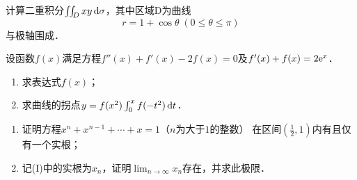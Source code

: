 \documentclass[plain,noanswer,medmath]{../../template/jnuexam}
\begin{document}
\begin{problem}[points=10]计算二重积分$\iint_D xy\d\sigma$，其中区域D为曲线
$$r = 1 + \cos \theta \;\left(0 \le \theta \le \pi \right)$$
与极轴围成．
\end{problem}


\begin{problem}[points=11]
设函数$f(x)$满足方程$f''(x) + f'(x) - 2f(x) = 0$及$f'(x) + f(x) = 2\mathrm{e}^x$．
\begin{enumerate}
\item 求表达式$f(x)$；
\item 求曲线的拐点$y = f(x^2)\int_0^x f(- t^2)\mathop{}\!\mathrm{d} t$．
\end{enumerate}
\end{problem}




\begin{problem}[points=11]
\begin{enumerate}
\item
证明方程$x^n + x^{n - 1} + \cdots + x = 1$（$n$为大于$1$的整数）%
在区间$\left(\frac{1}{2},1 \right)$内有且仅有一个实根；
\item
记(I)中的实根为$x_n$，证明$\lim_{n \to \infty} x_n$存在，并求此极限．
\end{enumerate}
\end{problem}




\end{document}
